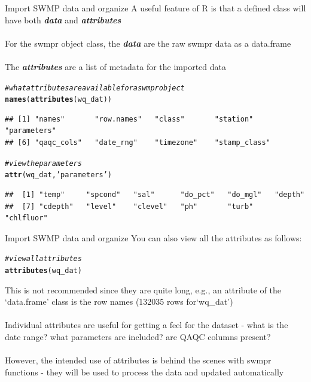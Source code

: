 \documentclass[xcolor=svgnames]{beamer}\usepackage[]{graphicx}\usepackage[]{color}
\makeatletter
\newcommand{\hlstr}[1]{\textcolor[rgb]{0.192,0.494,0.8}{#1}}%
\newcommand{\hlcom}[1]{\textcolor[rgb]{0.678,0.584,0.686}{\textit{#1}}}%
\newcommand{\hlstd}[1]{\textcolor[rgb]{0.345,0.345,0.345}{#1}}%
\newcommand{\hlkwd}[1]{\textcolor[rgb]{0.737,0.353,0.396}{\textbf{#1}}}%
\newenvironment{kframe}{%
 \def\at@end@of@kframe{}%
 \ifinner\ifhmode%
  \def\at@end@of@kframe{\end{minipage}}%
  \begin{minipage}{\columnwidth}%
 \fi\fi%
 \def\FrameCommand##1{\hskip\@totalleftmargin \hskip-\fboxsep
 \colorbox{shadecolor}{##1}\hskip-\fboxsep
     \hskip-\linewidth \hskip-\@totalleftmargin \hskip\columnwidth}%
 \MakeFramed {\advance\hsize-\width
   \@totalleftmargin\z@ \linewidth\hsize
   \@setminipage}}%
 {\par\unskip\endMakeFramed%
 \at@end@of@kframe}
\newenvironment{knitrout}{}{} %
\newcommand{\Bigtxt}[1]{\textbf{\textit{#1}}}
\makeatother
\begin{document}
\begin{frame}{Import SWMP data and organize}
A useful feature of R is that a defined class will have both \Bigtxt{data} and \Bigtxt{attributes}\\~\\
For the swmpr object class, the \Bigtxt{data} are the raw swmpr data as a data.frame \\~\\
The \Bigtxt{attributes} are a list of metadata for the imported data
\begin{knitrout}\scriptsize
{}\color{fgcolor}\begin{kframe}
\begin{alltt}
\hlcom{# what attributes are available for a swmpr object}
\hlkwd{names}\hlstd{(}\hlkwd{attributes}\hlstd{(wq_dat))}
\end{alltt}
\begin{verbatim}
## [1] "names"       "row.names"   "class"       "station"     "parameters" 
## [6] "qaqc_cols"   "date_rng"    "timezone"    "stamp_class"
\end{verbatim}
\begin{alltt}
\hlcom{# view the parameters}
\hlkwd{attr}\hlstd{(wq_dat,} \hlstr{'parameters'}\hlstd{)}
\end{alltt}
\begin{verbatim}
##  [1] "temp"     "spcond"   "sal"      "do_pct"   "do_mgl"   "depth"   
##  [7] "cdepth"   "level"    "clevel"   "ph"       "turb"     "chlfluor"
\end{verbatim}
\end{kframe}
\end{knitrout}
\end{frame}

\begin{frame}[fragile]{Import SWMP data and organize}
You can also view all the attributes as follows:
\begin{knitrout}\scriptsize
{}\color{fgcolor}\begin{kframe}
\begin{alltt}
\hlcom{# view all attributes}
\hlkwd{attributes}\hlstd{(wq_dat)}
\end{alltt}
\end{kframe}
\end{knitrout}
This is not recommended since they are quite long, e.g., an attribute of the `data.frame' class is the row names (132035 rows for`wq\_dat') \\~\\
Individual attributes are useful for getting a feel for the dataset - what is the date range? what parameters are included? are QAQC columns present? \\~\\
However, the intended use of attributes is behind the scenes with swmpr functions - they will be used to process the data and updated automatically
\end{frame}
\end{document}
